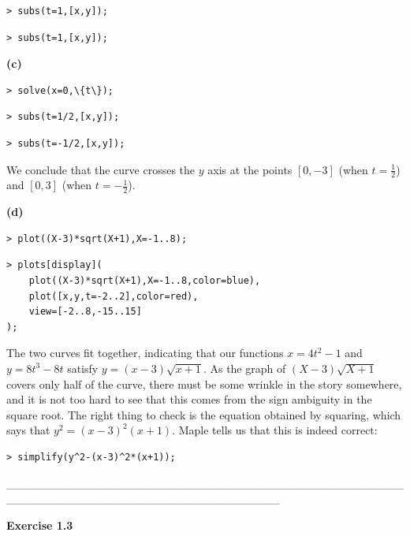 \documentclass{article}
\begin{document}
\begin{lstlisting}
> subs(t=1,[x,y]);
\end{lstlisting}
\begin{lstlisting}
> subs(t=1,[x,y]);
\end{lstlisting}
\textbf{(c)} \begin{lstlisting}
> solve(x=0,\{t\});
\end{lstlisting}
\begin{lstlisting}
> subs(t=1/2,[x,y]);
\end{lstlisting}
\begin{lstlisting}
> subs(t=-1/2,[x,y]);
\end{lstlisting}
\begin{Maple Normal}
We conclude that the curve crosses the 
$ y  $ axis at the points 
$ [0,-3] $ (when 
$ t =\frac{1}{2} $) and 
$ [0,3] $ (when 
$ t =-\frac{1}{2} $).
\end{Maple Normal}
\textbf{(d)}\begin{lstlisting}
> plot((X-3)*sqrt(X+1),X=-1..8);
\end{lstlisting}
\begin{lstlisting}
> plots[display](
    plot((X-3)*sqrt(X+1),X=-1..8,color=blue),
    plot([x,y,t=-2..2],color=red),
    view=[-2..8,-15..15]     
);
\end{lstlisting}
\begin{Maple Normal}
The two curves fit together, indicating that our functions 
$ x =4 t^{2}-1 $ and 
$ y =8 t^{3}-8 t  $ satisfy 
$ y =(x -3) \sqrt{x +1} $.  As the graph of 
$ (X -3) \sqrt{X +1} $ covers only half of the curve, there must be some wrinkle in the story somewhere, and it is not too hard to see that this comes from the sign ambiguity in the square root.  The right thing to check is the equation obtained by squaring, which says that 
$ y^{2}=(x -3)^{2} (x +1) $.  Maple tells us that this is indeed correct:
\end{Maple Normal}
\begin{lstlisting}
> simplify(y^2-(x-3)^2*(x+1));
\end{lstlisting}
\begin{Maple Normal}
\_\_\_\_\_\_\_\_\_\_\_\_\_\_\_\_\_\_\_\_\_\_\_\_\_\_\_\_\_\_\_\_\_\_\_\_\_\_\_\_\_\_\_\_\_\_\_\_\_\_\_\_\_\_\_\_\_\_\_\_\_\_\_\_\_\_\_\_\_\_\_\_\_\_\_\_\_\_\_\_\_
\end{Maple Normal}
\begin{Maple Normal}
\textbf{Exercise 1.3}
\end{Maple Normal}
\begin{Maple Normal}

\end{Maple Normal}
\end{document}
